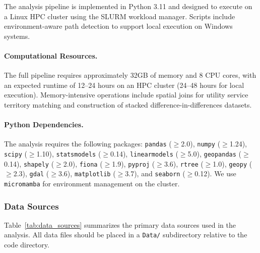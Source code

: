 \documentclass[a4paper,fleqn,longmktitle]{cas-sc}
\begin{document}
The analysis pipeline is implemented in Python 3.11 and designed to execute on a Linux HPC cluster using the SLURM workload manager. Scripts include environment-aware path detection to support local execution on Windows systems.

\paragraph{Computational Resources.} The full pipeline requires approximately 32GB of memory and 8 CPU cores, with an expected runtime of 12--24 hours on an HPC cluster (24--48 hours for local execution). Memory-intensive operations include spatial joins for utility service territory matching and construction of stacked difference-in-differences datasets.

\paragraph{Python Dependencies.} The analysis requires the following packages: \texttt{pandas} ($\geq$2.0), \texttt{numpy} ($\geq$1.24), \texttt{scipy} ($\geq$1.10), \texttt{statsmodels} ($\geq$0.14), \texttt{linearmodels} ($\geq$5.0), \texttt{geopandas} ($\geq$0.14), \texttt{shapely} ($\geq$2.0), \texttt{fiona} ($\geq$1.9), \texttt{pyproj} ($\geq$3.6), \texttt{rtree} ($\geq$1.0), \texttt{geopy} ($\geq$2.3), \texttt{gdal} ($\geq$3.6), \texttt{matplotlib} ($\geq$3.7), and \texttt{seaborn} ($\geq$0.12). We use \texttt{micromamba} for environment management on the cluster.

\subsubsection{Data Sources}
\label{appendix:data}

Table~\ref{tab:data_sources} summarizes the primary data sources used in the analysis. All data files should be placed in a \texttt{Data/} subdirectory relative to the code directory.
\end{document}
